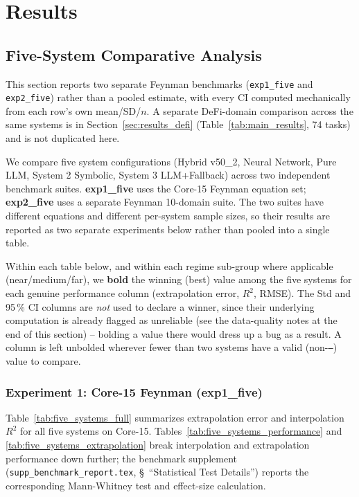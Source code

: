\documentclass[twoside,11pt]{article}
\begin{document}
\section{Results}
\label{sec:results}

\subsection{Five-System Comparative Analysis}\label{subsec:fivesystem-comparative-analysis-feynman-}
\label{sec:five_systems}

This section reports two separate Feynman benchmarks (\texttt{exp1\_five} and
\texttt{exp2\_five}) rather than a pooled estimate, with every CI computed
mechanically from each row's own mean/SD/$n$. A separate DeFi-domain comparison
across the same systems is in Section~\ref{sec:results_defi}
(Table~\ref{tab:main_results}, 74 tasks) and is not duplicated here.

We compare five system configurations (Hybrid v50\_2, Neural Network, Pure
LLM, System 2 Symbolic, System 3 LLM+Fallback) across two independent
benchmark suites. \textbf{exp1\_five} uses the Core-15 Feynman equation set;
\textbf{exp2\_five} uses a separate Feynman 10-domain suite. The two suites
have different equations and different per-system sample sizes, so their
results are reported as two separate experiments below rather than pooled
into a single table.

Within each table below, and within each regime sub-group where applicable
(near/medium/far), we \textbf{bold} the winning (best) value among the five
systems for each genuine performance column (extrapolation error, $R^2$,
RMSE). The Std and 95\,\% CI columns are \emph{not} used to declare a winner,
since their underlying computation is already flagged as unreliable (see the
data-quality notes at the end of this section) -- bolding a value there would
dress up a bug as a result. A column is left unbolded wherever fewer than two
systems have a valid (non-\texttt{---}) value to compare.

\subsubsection{Experiment 1: Core-15 Feynman (exp1\_five)}\label{subsubsec:five-system-exp1}

Table~\ref{tab:five_systems_full} summarizes extrapolation error
and interpolation $R^2$ for all five systems on Core-15. Tables~\ref{tab:five_systems_performance}
and \ref{tab:five_systems_extrapolation} break interpolation and extrapolation
performance down further; the benchmark supplement
(\texttt{supp\_benchmark\_report.tex}, \S~``Statistical Test Details'') reports
the corresponding Mann-Whitney test and effect-size calculation.
\end{document}

